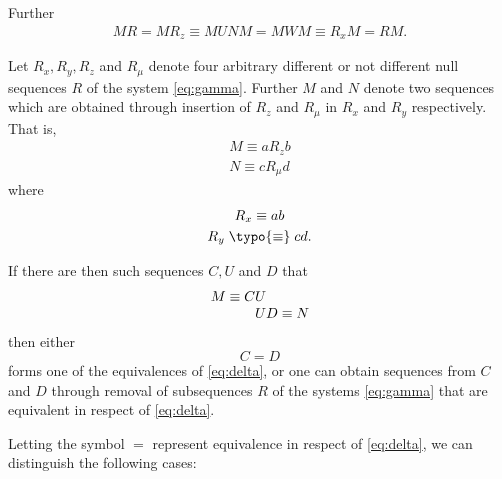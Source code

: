 Further
\begin{gather*}
MR = MR_z \equiv MUNM = MWM \equiv R_xM = RM.
\end{gather*}

Let $R_x, R_y, R_z$ and $R_\mu$ denote four arbitrary different or not
different null sequences $R$ of the system \eqref{eq:gamma}.
Further $M$ and $N$ denote two sequences which are obtained through
insertion of $R_z$ and $R_\mu$ in $R_x$ and $R_y$ respectively.  That
is,
\begin{gather*}
M \equiv aR_zb\\
N \equiv c R_\mu d
\end{gather*}
where
\begin{gather*}
R_x \equiv ab\\
R_y \;\typo{\equiv}\; cd.
\end{gather*}

If there are then such sequences $C,U$ and $D$ that
$$\begin{array}{r@{}c@{}l}
M \equiv C&U&\\
      &U&D \equiv N
\end{array}$$
then either
$$C = D$$
forms one of the equivalences of \eqref{eq:delta}, or one can obtain
sequences from $C$ and $D$ through removal of subsequences $R$ of the
systems \eqref{eq:gamma} that are equivalent in respect of
\eqref{eq:delta}.

Letting the symbol $=$ represent equivalence in respect of
\eqref{eq:delta}, we can distinguish the following
cases:

